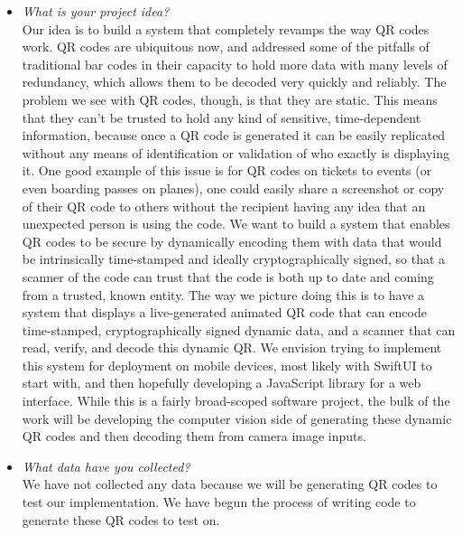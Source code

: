 \begin{itemize}
    \item \emph{What is your project idea?} \\ 
    Our idea is to build a system that completely revamps the way QR codes work. QR codes are ubiquitous now, and addressed some of the pitfalls of traditional bar codes in their capacity to hold more data with many levels of redundancy, which allows them to be decoded very quickly and reliably. The problem we see with QR codes, though, is that they are static. This means that they can’t be trusted to hold any kind of sensitive, time-dependent information, because once a QR code is generated it can be easily replicated without any means of identification or validation of who exactly is displaying it. One good example of this issue is for QR codes on tickets to events (or even boarding passes on planes), one could easily share a screenshot or copy of their QR code to others without the recipient having any idea that an unexpected person is using the code. We want to build a system that enables QR codes to be secure by dynamically encoding them with data that would be intrinsically time-stamped and ideally cryptographically signed, so that a scanner of the code can trust that the code is both up to date and coming from a trusted, known entity. The way we picture doing this is to have a system that displays a live-generated animated QR code that can encode time-stamped, cryptographically signed dynamic data, and a scanner that can read, verify, and decode this dynamic QR. We envision trying to implement this system for deployment on mobile devices, most likely with SwiftUI to start with, and then hopefully developing a JavaScript library for a web interface. While this is a fairly broad-scoped software project, the bulk of the work will be developing the computer vision side of generating these dynamic QR codes and then decoding them from camera image inputs.
    \item \emph{What data have you collected?} \\
    We have not collected any data because we will be generating QR codes to test our implementation. We have begun the process of writing code to generate these QR codes to test on.
    

\end{itemize}
